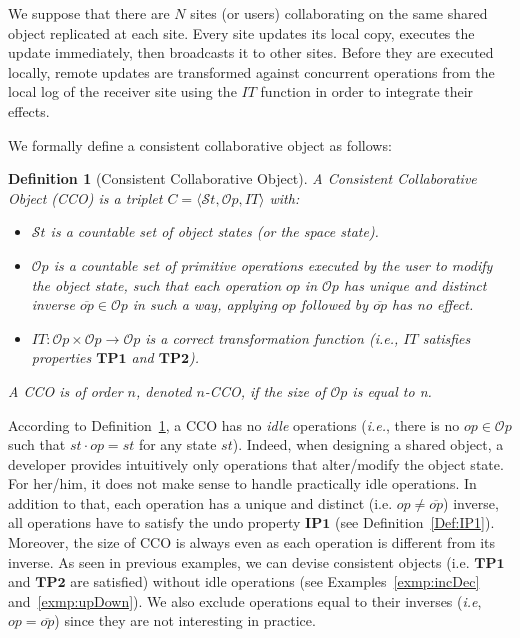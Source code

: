 \documentclass[submission,copyright,creativecommons]{eptcs}
\newtheorem{definition}{Definition}
\begin{document}
We suppose that there are $N$ sites (or users) collaborating on the same shared object replicated at each site.
Every site updates its local copy, executes the update immediately, then broadcasts it to other sites.
Before they are executed locally, remote updates are transformed against concurrent operations from the local log of the receiver site using the $IT$ function in order to integrate their effects. 

We formally define  a consistent collaborative object as follows:
\begin{definition}[Consistent Collaborative Object]\label{def:cco}
A \emph{Consistent Collaborative Object}  (CCO) is a triplet $C=\langle\mathcal{S}t,\mathcal{O}p,IT\rangle$ with:
\begin{itemize}[$\bullet$]
\item $\mathcal{S}t$ is a countable set of object \emph{states} (or the space state).\vspace{-.15cm}
\item $\mathcal{O}p$ is a countable set of \emph{primitive operations} executed by the user to \emph{modify} the object state, such that
each operation $op$ in $\mathcal{O}p$ has \emph{unique} and \emph{distinct  inverse} $\overline{op} \in \mathcal{O}p$
in such a way, applying $op$ followed by $\overline{op}$ has no effect.\vspace{-.15cm}
\item $IT : \mathcal{O}p\times \mathcal{O}p \rightarrow \mathcal{O}p$ is a \emph{correct} transformation function (\textit{i.e.},
$IT$ satisfies properties $\mathbf{TP1}$ and $\mathbf{TP2}$). 
\end{itemize}
 A CCO is of order $n$, denoted $n$-CCO, if the size of $\mathcal{O}p$ is equal to n.
\end{definition}

 
According to Definition~\ref{def:cco},  a CCO has no \emph{idle} operations (\textit{i.e.}, there is no $op\in \mathcal{O}p$ such that $st\cdot op = st$ for
any state $st$). Indeed,  when designing a shared object, a developer provides intuitively only operations that alter/modify the
object state. For her/him, it does not make sense to handle practically idle operations.  In addition to that, each operation has a unique and distinct (i.e. $op \neq \overline{op}$)
inverse, all operations have to satisfy the undo property $\mathbf{IP1}$ (see Definition~\ref{Def:IP1}).
Moreover,  the size of CCO is always even as each operation is different from its inverse. 
As seen in  previous examples, we can devise consistent objects (i.e. $\mathbf{TP1}$ and $\mathbf{TP2}$ are satisfied) 
without idle operations (see Examples~\ref{exmp:incDec} and~\ref{exmp:upDown}). 
We also exclude operations equal to their inverses (\emph{i.e}, $op=\overline{op}$) since they are not interesting in practice.
\end{document}
